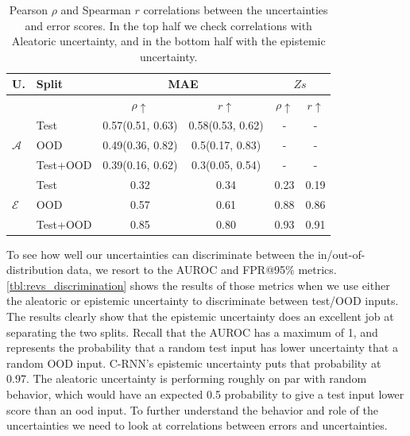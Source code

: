 \begin{table}[htbp]
\centering
    \begin{tabular}{l l c c c c}  
        \toprule
        U. & Split & \multicolumn{2}{c}{MAE} & \multicolumn{2}{c}{$Zs$}\\
        \midrule
        & & $\rho \uparrow$ & $r \uparrow$ & $\rho \uparrow$ & $r \uparrow$ \\
        \multirow{3}{*}{$\mathcal{A}$} 
            & Test     & 0.57(0.51, 0.63) & 0.58(0.53, 0.62) & - & - \\  
            & OOD      & 0.49(0.36, 0.82) & 0.5(0.17, 0.83) & - & - \\  
            & Test+OOD & 0.39(0.16, 0.62) & 0.3(0.05, 0.54) & - & - \\ 

        \midrule
        \multirow{3}{*}{$\mathcal{E}$} 
            & Test     & 0.32  & 0.34 &  0.23  & 0.19 \\  
            & OOD      & 0.57 & 0.61 &  0.88 & 0.86 \\
            & Test+OOD & 0.85 & 0.80 &  0.93 & 0.91 \\ 

        \toprule
    \end{tabular}
    \caption{Pearson $\rho$ and Spearman $r$ correlations between the uncertainties and error scores. In the top half we check correlations with Aleatoric uncertainty, and in the bottom half with the epistemic uncertainty.}
    \label{tbl:revs_corr}
\end{table}


To see how well our uncertainties can discriminate between the in/out-of-distribution data, we resort to the AUROC and FPR@95\% metrics. \cref{tbl:revs_discrimination} shows the results of those metrics when we use either the aleatoric or epistemic uncertainty to discriminate between test/OOD inputs. The results clearly show that the epistemic uncertainty does an excellent job at separating the two splits. Recall that the AUROC has a maximum of 1, and represents the probability that a random test input has lower uncertainty that a random OOD input. C-RNN's epistemic uncertainty puts that probability at 0.97. The aleatoric uncertainty is performing roughly on par with random behavior, which would have an expected 0.5 probability to give a test input lower score than an ood input.
To further understand the behavior and role of the uncertainties we need to look at correlations between errors and uncertainties. 


